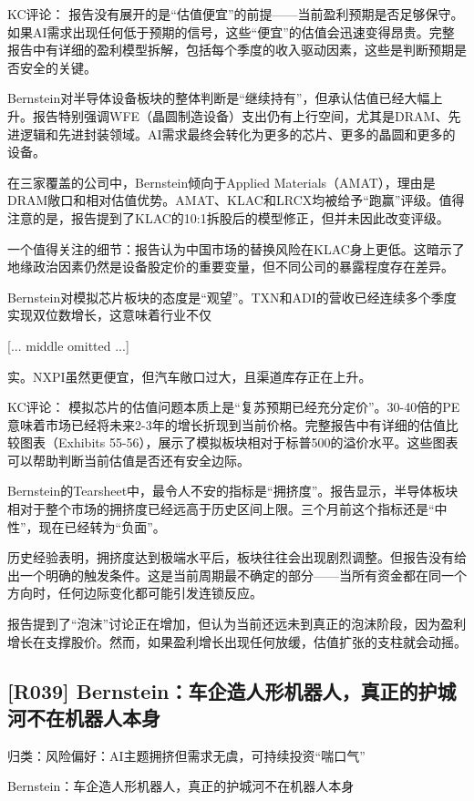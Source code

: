 \documentclass[11pt]{ctexart}
\begin{document}
KC评论： 报告没有展开的是“估值便宜”的前提——当前盈利预期是否足够保守。如果AI需求出现任何低于预期的信号，这些“便宜”的估值会迅速变得昂贵。完整报告中有详细的盈利模型拆解，包括每个季度的收入驱动因素，这些是判断预期是否安全的关键。

Bernstein对半导体设备板块的整体判断是“继续持有”，但承认估值已经大幅上升。报告特别强调WFE（晶圆制造设备）支出仍有上行空间，尤其是DRAM、先进逻辑和先进封装领域。AI需求最终会转化为更多的芯片、更多的晶圆和更多的设备。

在三家覆盖的公司中，Bernstein倾向于Applied Materials（AMAT），理由是DRAM敞口和相对估值优势。AMAT、KLAC和LRCX均被给予“跑赢”评级。值得注意的是，报告提到了KLAC的10:1拆股后的模型修正，但并未因此改变评级。

一个值得关注的细节：报告认为中国市场的替换风险在KLAC身上更低。这暗示了地缘政治因素仍然是设备股定价的重要变量，但不同公司的暴露程度存在差异。

Bernstein对模拟芯片板块的态度是“观望”。TXN和ADI的营收已经连续多个季度实现双位数增长，这意味着行业不仅

[... middle omitted ...]

实。NXPI虽然更便宜，但汽车敞口过大，且渠道库存正在上升。

KC评论： 模拟芯片的估值问题本质上是“复苏预期已经充分定价”。30-40倍的PE意味着市场已经将未来2-3年的增长折现到当前价格。完整报告中有详细的估值比较图表（Exhibits 55-56），展示了模拟板块相对于标普500的溢价水平。这些图表可以帮助判断当前估值是否还有安全边际。

Bernstein的Tearsheet中，最令人不安的指标是“拥挤度”。报告显示，半导体板块相对于整个市场的拥挤度已经远高于历史区间上限。三个月前这个指标还是“中性”，现在已经转为“负面”。

历史经验表明，拥挤度达到极端水平后，板块往往会出现剧烈调整。但报告没有给出一个明确的触发条件。这是当前周期最不确定的部分——当所有资金都在同一个方向时，任何边际变化都可能引发连锁反应。

报告提到了“泡沫”讨论正在增加，但认为当前还远未到真正的泡沫阶段，因为盈利增长在支撑股价。然而，如果盈利增长出现任何放缓，估值扩张的支柱就会动摇。

\subsection{[R039] Bernstein：车企造人形机器人，真正的护城河不在机器人本身}
{\small\color{refgray}归类：风险偏好：AI主题拥挤但需求无虞，可持续投资“喘口气”}

Bernstein：车企造人形机器人，真正的护城河不在机器人本身
\end{document}
